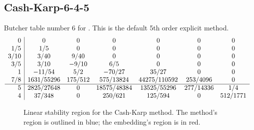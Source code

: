 \documentclass[letterpaper,10pt,english]{sphinxmanual}
\begin{document}
\subsection{Cash-Karp-6-4-5}
\label{Butcher:cash-karp-6-4-5}\label{Butcher:butcher-cash-karp}
Butcher table number 6
for {\hyperref[c_interface/User_callable:ARKodeSetERKTableNum]{}}.  This is
the default 5th order explicit method.
\begin{gather}
\begin{split}\begin{array}{r|cccccc}
  0 & 0 & 0 & 0 & 0 & 0 & 0 \\
  1/5 & 1/5 & 0 & 0 & 0 & 0 & 0 \\
  3/10 & 3/40 & 9/40 & 0 & 0 & 0 & 0 \\
  3/5 & 3/10 & -9/10 & 6/5 & 0 & 0 & 0 \\
  1 & -11/54 & 5/2 & -70/27 & 35/27 & 0 & 0 \\
  7/8 & 1631/55296 & 175/512 & 575/13824 & 44275/110592 & 253/4096 & 0 \\
  \hline
  5 & 2825/27648 & 0 & 18575/48384 & 13525/55296 & 277/14336 & 1/4 \\
  4 & 37/348 & 0 & 250/621 & 125/594 & 0 & 512/1771
\end{array}\end{split}\notag
\end{gather}\begin{figure}[htbp]
\centering
\capstart

\caption{Linear stability region for the Cash-Karp method.  The method's
region is outlined in blue; the embedding's region is in red.}\end{figure}
\end{document}
